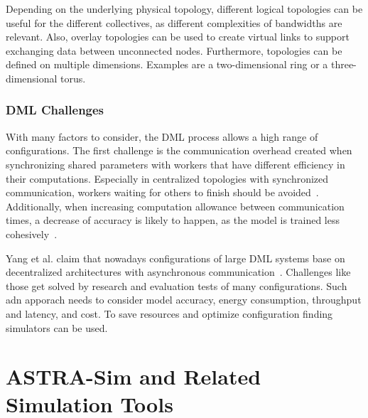 Depending on the underlying physical topology, different logical topologies can be useful for the different collectives, as different complexities of bandwidths are relevant. Also, overlay topologies can be used to create virtual links to support exchanging data between unconnected nodes. %
Furthermore, topologies can be defined on multiple dimensions. Examples are a two-dimensional ring or a three-dimensional torus.





\subsubsection*{DML Challenges}
\label{sec:discussion}
With many factors to consider, the \ac{DML} process allows a high range of configurations.
The first challenge is the communication overhead created when synchronizing shared parameters with workers that have different efficiency in their computations. 
Especially in centralized topologies with synchronized communication, workers waiting for others to finish should be avoided~\cite{sze_hardware_2017}. 
Additionally, when increasing computation allowance between communication times, a decrease of accuracy is likely to happen, as the model is trained less cohesively~\cite{yang_balancing_2025}.

Yang et al. claim that nowadays configurations of large \ac{DML} systems base on decentralized architectures with asynchronous communication~\cite{yang_balancing_2025}. 
Challenges like those get solved by research and evaluation tests of many configurations. Such adn apporach needs to consider model accuracy, energy consumption, throughput and latency, and cost\cite{lee_model_2014}. To save resources and optimize configuration finding simulators can be used.

\section{ASTRA-Sim and Related Simulation Tools}

